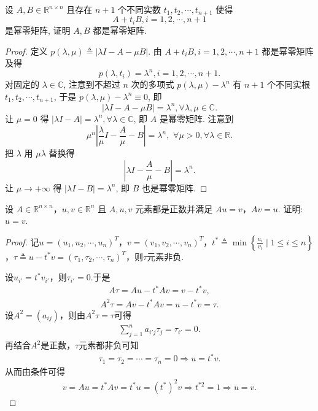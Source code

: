 \documentclass[../../main.tex]{subfiles}%
\begin{document}
\begin{example}
设 \( A,B \in \mathbb{R}^{n \times n} \) 且存在 \( n+1 \) 个不同实数 \( t_1,t_2,\cdots,t_{n+1} \) 使得
\[
A + t_i B, i = 1,2,\cdots,n+1
\]
是幂零矩阵, 证明 \( A,B \) 都是幂零矩阵.
\end{example}
\begin{proof}

定义 \( p(\lambda,\mu) \triangleq |\lambda I - A - \mu B| \). 由 \( A + t_i B, i = 1,2,\cdots,n+1 \) 都是幂零矩阵及得
\[
p(\lambda,t_i) = \lambda^n, i = 1,2,\cdots,n+1.
\]
对固定的 \( \lambda \in \mathbb{C} \), 注意到不超过 \( n \) 次的多项式 \( p(\lambda,\mu)-\lambda^n \) 有 \( n+1 \) 个不同实根 \( t_1,t_2,\cdots,t_{n+1} \), 于是 \( p(\lambda,\mu)-\lambda^n \equiv 0 \), 即
\[
|\lambda I - A - \mu B| = \lambda^n, \forall \lambda, \mu \in \mathbb{C}.
\]
让 \( \mu = 0 \) 得 \( |\lambda I - A| = \lambda^n, \forall \lambda \in \mathbb{C} \), 即 \( A \) 是幂零矩阵. 注意到
\[
\mu^n \left| \frac{\lambda}{\mu} I - \frac{A}{\mu} - B \right| = \lambda^n,\,\, \forall \mu >0,\forall \lambda \in \mathbb{R}.
\]
把 \( \lambda \) 用 \( \mu\lambda \) 替换得
\[
\left| \lambda I - \frac{A}{\mu} - B \right| = \lambda^n.
\]
让 \( \mu \to +\infty \) 得 \( |\lambda I - B| = \lambda^n \), 即 \( B \) 也是幂零矩阵.

\end{proof}

\begin{example}
设 \( A \in \mathbb{R}^{n \times n} \)，\( u, v \in \mathbb{R}^n \) 且 \( A, u, v \) 元素都是正数并满足 \( Au = v \)，\( Av = u \). 证明: \( u = v \).
\end{example}
\begin{proof}

记$u=(u_1,u_2,\cdots,u_n)^T$，$v=(v_1,v_2,\cdots,v_n)^T$，$t^*\triangleq\min\left\{\frac{u_i}{v_i}\mid 1\leqslant i\leqslant n\right\}$，$\tau\triangleq u-t^*v=(\tau_1,\tau_2,\cdots,\tau_n)^T$，则$\tau$元素非负.

设$u_{i'}=t^*v_{i'}$，则$\tau_{i'}=0$.于是
\begin{align*}
A\tau=Au-t^*Av=v-t^*v,
\end{align*}
\begin{align*}
A^2\tau=Av-t^*Av=u-t^*v=\tau.
\end{align*}
设$A^2=(a_{ij})$，则由$A^2\tau=\tau$可得
\begin{align*}
\sum_{j=1}^n a_{i'j}\tau_j=\tau_{i'}=0.
\end{align*}
再结合$A^2$是正数，$\tau$元素都非负可知
\begin{align*}
\tau_1=\tau_2=\cdots=\tau_n=0\Longrightarrow u=t^*v.
\end{align*}
从而由条件可得
\begin{align*}
v=Au=t^*Av=t^*u=(t^*)^2v\Longrightarrow t^{*2}=1\Longrightarrow u=v.
\end{align*}

\end{proof}
\end{document}
